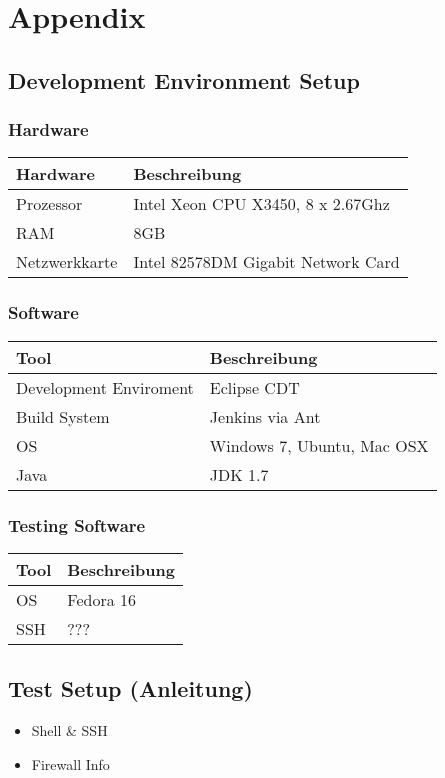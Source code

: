 \section{Appendix}

\subsection{Development Environment Setup}

\subsubsection{Hardware}
\begin{tabular}[ht]{l l}
  Hardware & Beschreibung\\
  \hline
  Prozessor & Intel Xeon CPU X3450, 8 x 2.67Ghz\\
  RAM & 8GB\\
  Netzwerkkarte & Intel 82578DM Gigabit Network Card\\
\end{tabular}

\subsubsection{Software}
\begin{tabular}[ht]{l l}
  Tool & Beschreibung\\
  \hline
  Development Enviroment & Eclipse CDT\\
    Build System & Jenkins via Ant\\
  OS & Windows 7, Ubuntu, Mac OSX\\
  Java & JDK 1.7\\
\end{tabular}

\subsubsection{Testing Software}
\begin{tabular}[ht]{l l}
  Tool & Beschreibung\\
  \hline
  OS & Fedora 16\\
  SSH & ???\\
\end{tabular}

	
\subsection{Test Setup (Anleitung)}
\begin{itemize}
\item Shell \& SSH
\item Firewall Info
\end{itemize}	
